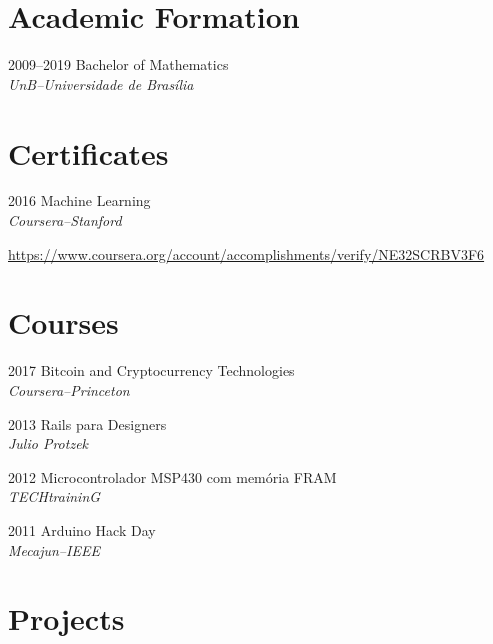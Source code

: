 \documentclass[a4paper,twoside]{simplecv}
\begin{document}
\section{Academic Formation}

\begin{topic}
\item[2009--2019] Bachelor of Mathematics\\
	{\em\small UnB--Universidade de Brasília}

\end{topic}

\section{Certificates}

\begin{topic}
\item[2016] Machine Learning\\
	{\em\small Coursera--Stanford}

	{\scriptsize\url{https://www.coursera.org/account/accomplishments/verify/NE32SCRBV3F6}}
\end{topic}

\section{Courses}

\begin{topic}
\item[2017] Bitcoin and Cryptocurrency Technologies\\
	{\em\small Coursera--Princeton}
\item[2013] Rails para Designers\\
	{\em\small Julio Protzek}
\item[2012] Microcontrolador MSP430 com memória FRAM\\
	{\em\small TECHtraininG}
\item[2011] Arduino Hack Day\\
	{\em\small Mecajun--IEEE}
\end{topic}

\section{Projects}
\end{document}
